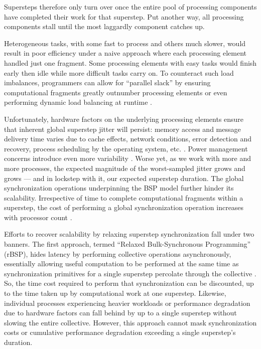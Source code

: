 Supersteps therefore only turn over once the entire pool of processing components have completed their work for that superstep.
Put another way, all processing components stall until the most laggardly component catches up.

Heterogeneous tasks, with some fast to process and others much slower, would result in poor efficiency under a naive approach where each processing element handled just one fragment.
Some processing elements with easy tasks would finish early then idle while more difficult tasks carry on.
To counteract such load imbalances, programmers can allow for ``parallel slack'' by ensuring computational fragments greatly outnumber processing elements or even performing dynamic load balancing at runtime \citep{valiant1990bridging}.

Unfortunately, hardware factors on the underlying processing elements ensure that inherent global superstep jitter will persist: memory access and message delivery time varies due to cache effects, network conditions, error detection and recovery, process scheduling by the operating system, etc. \citep{dongarra2014applied}.
Power management concerns introduce even more variability \citep{gropp2013programming}.
Worse yet, as we work with more and more processes, the expected magnitude of the worst-sampled jitter grows and grows --- and in lockstep with it, our expected superstep duration.
The global synchronization operations underpinning the BSP model further hinder its scalability.
Irrespective of time to complete computational fragments within a superstep, the cost of performing a global synchronization operation increases with processor count \citep{dongarra2014applied}.

Efforts to recover scalability by relaxing superstep synchronization fall under two banners.
The first approach, termed ``Relaxed Bulk-Synchronous Programming'' (rBSP), hides latency by performing collective operations asynchronously, essentially allowing useful computation to be performed at the same time as synchronization primitives for a single superstep percolate through the collective \citep{heroux2014toward}.
So, the time cost required to perform that synchronization can be discounted, up to the time taken up by computational work at one superstep.
Likewise, individual processes experiencing heavier workloads or performance degradation due to hardware factors can fall behind by up to a single superstep without slowing the entire collective.
However, this approach cannot mask synchronization costs or cumulative performance degradation exceeding a single superstep's duration.


